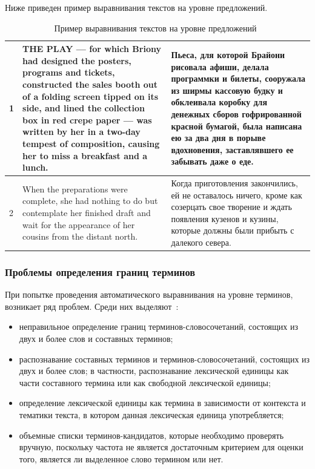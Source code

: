 Ниже приведен пример выравнивания текстов на уровне предложений.

\begin{table}[H]
    \centering
    \begin{tabular}{|p{1cm}|p{7cm}|p{7cm}|}
        \hline
        1 & THE PLAY — for which Briony had designed the posters, programs and tickets, constructed the sales booth out of a folding screen tipped on its side, and lined the collection box in red crepe paper — was written by her in a two-day tempest of composition, causing her to miss a breakfast and a lunch. & Пьеса, для которой Брайони рисовала афиши, делала программки и билеты, сооружала из ширмы кассовую будку и обклеивала коробку для денежных сборов гофрированной красной бумагой, была написана ею за два дня в порыве вдохновения, заставлявшего ее забывать даже о еде. \\ \hline
        2 & When the preparations were complete, she had nothing to do but contemplate her finished draft and wait for the appearance of her cousins from the distant north. & Когда приготовления закончились, ей не оставалось ничего, кроме как созерцать свое творение и ждать появления кузенов и кузины, которые должны были прибыть с далекого севера. \\ \hline
    \end{tabular}
    \caption{Пример выравнивания текстов на уровне предложений~\cite{cl2020}}
    \label{tab:al}
\end{table}

\subsubsection*{Проблемы определения границ терминов}

При попытке проведения автоматического выравнивания на уровне терминов, возникает ряд проблем.
Среди них выделяют~\cite{butenko2022}:
\begin{itemize}
    \item неправильное определение границ терминов-словосочетаний, состоящих из двух и более слов и составных терминов; 
    \item  распознавание составных терминов и терминов-словосочетаний, состоящих из двух и более слов; в частности, распознавание лексической единицы как части составного термина или как свободной лексической единицы; 
    \item определение лексической единицы как термина в зависимости от контекста и тематики текста, в котором данная лексическая единица употребляется; 
    \item объемные списки терминов-кандидатов, которые необходимо проверять вручную, поскольку частота не является достаточным критерием для оценки того, является ли выделенное слово термином или нет. 
\end{itemize}


